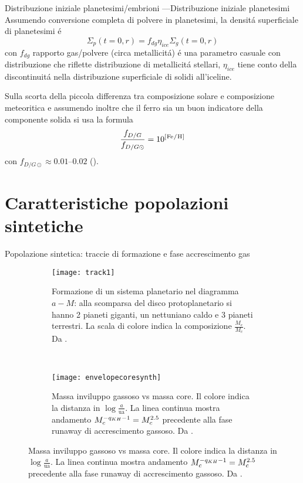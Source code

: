 \begin{wordonframe}{Distribuzione iniziale planetesimi/embrioni}
---Distribuzione iniziale planetesimi
Assumendo conversione completa di polvere in planetesimi, la densit\'a superficiale di planetesimi \'e
\begin{equation}
\Sigma_p(t=0,r)=f_{dg}\eta_{ice}\Sigma_g(t=0,r)
\end{equation}
con $f_{dg}$ rapporto gas/polvere (circa metallicit\'a) \'e una parametro casuale con distribuzione che riflette distribuzione di metallicit\'a stellari, $\eta_{ice}$ tiene conto della discontinuit\'a nella distribuzione superficiale di solidi all'iceline.

Sulla scorta della piccola differenza tra composizione solare e composizione meteoritica e assumendo inoltre che il ferro sia un buon indicatore della componente solida  si usa la formula
\begin{equation}
\frac{f_{D/G}}{f_{D/G\odot}}=10\expy{[\cel{Fe}{}{}{}/\cel{H}{}{}{}]}
\end{equation}
con $f_{D/G\odot}\approx\numrange{0.01}{0.02}$ (\cite{lodders2003solar}).
\end{wordonframe}

\section{Caratteristiche popolazioni sintetiche}

\begin{frame}{Popolazione sintetica: traccie di formazione e fase accrescimento gas}

\begin{figure}[!ht]
	\begin{subfigure}[b]{0.48\textwidth}
		\centering
		\texttt{[image: track1]}
		\caption{Formazione di un sistema planetario nel diagramma $a-M$: alla scomparsa del disco protoplanetario si hanno 2 pianeti giganti, un nettuniano caldo e 3 pianeti terrestri. La scala di colore indica la composizione $\frac{M_e}{M_c}$. Da \cite{mordasini2018planetary}.}\label{fig:track1}
	\end{subfigure}
	~
	\begin{subfigure}[b]{0.49\textwidth}
		\centering
		\texttt{[image: envelopecoresynth]}
		\caption{Massa inviluppo gassoso vs massa core. Il colore indica la distanza in $\log{\frac{a}{\si{\astronomicalunit}}}$. La linea continua mostra andamento $M_c^{-q_{KH}-1}=M_c^{2.5}$ precedente alla fase runaway di accrescimento gassoso. Da \cite{mordasini2018planetary}. }\label{fig:envelopecoresynth}
	\end{subfigure}
\end{figure}
\end{frame}

